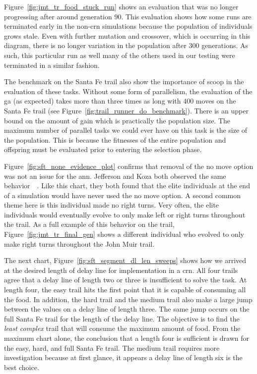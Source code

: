 Figure~\ref{fig:jmt_tr_food_stuck_run} shows an evaluation that was no longer progressing after around generation 90. This evaluation shows how some runs are terminated early in the non-\gls{crn} simulations because the population of individuals grows stale. Even with further mutation and crossover, which is occurring in this diagram, there is no longer variation in the population after 300 generations. As such, this particular run as well many of the others used in our testing were terminated in a similar fashion.

The benchmark on the Santa Fe trail also show the importance of \gls{scoop} in the evaluation of these tasks. Without some form of parallelism, the evaluation of the \gls{ga} (as expected) takes more than three times as long with 400 moves on the Santa Fe trail (see Figure~\ref{fig:trail_runner_do_benchmark}). There is an upper bound on the amount of gain which is practically the population size. The maximum number of parallel tasks we could ever have on this task is the size of the population. This is because the fitnesses of the entire population and offspring must be evaluated prior to entering the selection phase.

Figure~\ref{fig:sft_none_evidence_plot} confirms that removal of the no move option was not an issue for the \gls{ann}. Jefferson and Koza both observed the same behavior~\cite{Jefferson1992-ph}~\cite{Koza1992-xs}. Like this chart, they both found that the elite individuals at the end of a simulation would have never used the no move option. A second common theme here is this individual made no right turns. Very often, the elite individuals would eventually evolve to only make left or right turns throughout the trail. As a full example of this behavior on the trail, Figure~\ref{fig:jmt_tr_final_gen} shows a different individual who evolved to only make right turns throughout the John Muir trail.

The next chart, Figure~\ref{fig:sft_segment_dl_len_sweeps} shows how we arrived at the desired length of delay line for implementation in a \gls{crn}. All four trails agree that a delay line of length two or three is insufficient to solve the task. At length four, the easy trail hits the first point that it is capable of consuming all the food. In addition, the hard trail and the medium trail also make a large jump between the values on a delay line of length three. The same jump occurs on the full Santa Fe trail for the length of the delay line. The objective is to find the \textit{least complex} trail that will consume the maximum amount of food. From the maximum chart alone, the conclusion that a length four is sufficient is drawn for the easy, hard, and full Santa Fe trail. The medium trail requires more investigation because at first glance, it appears a delay line of length six is the best choice.

